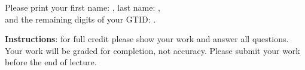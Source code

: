 \documentclass[11pt]{exam}
\begin{document}
    
\vspace*{-1cm}

\begin{center}
{\Large \TestName}
\end{center}
\newcommand{\ID}{Please print your first name: \framebox{\strut\hspace{4.2cm}}, last name: \framebox{\strut\hspace{4.2cm}}, \\[2pt] and the remaining digits of your GTID:  \framebox{\strut $9$}\framebox{\strut $0$}\framebox{\strut\hspace{0.19cm}}\framebox{\strut\hspace{0.19cm}}\framebox{\strut\hspace{0.19cm}}\framebox{\strut\hspace{0.19cm}}\framebox{\strut\hspace{0.19cm}}\framebox{\strut\hspace{0.19cm}}\framebox{\strut\hspace{0.19cm}}.}

\ID

\vspace{6pt}
\textbf{Instructions}: for full credit please show your work and answer all questions. Your work will be graded for completion, not accuracy. Please submit your work before the end of lecture. 
\def\dm{\displaystyle}

% 
\end{document}

